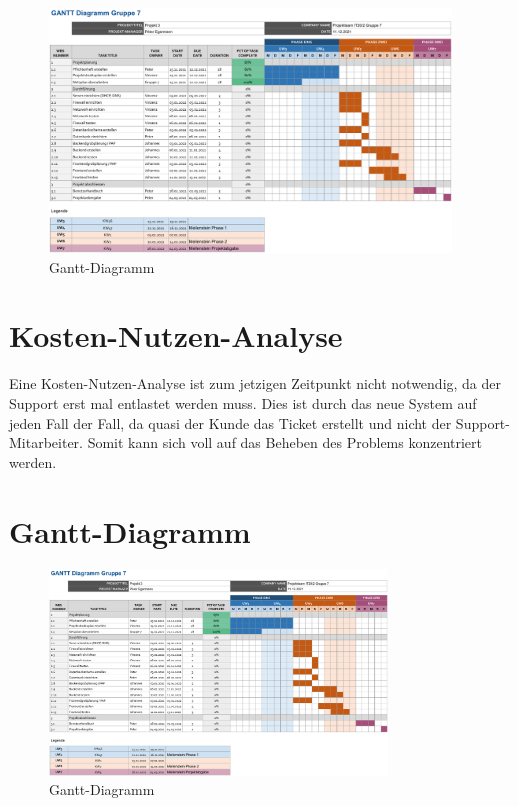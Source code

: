 \documentclass[a4paper,12pt,headings=small,ngerman,bibliography=totoc]{scrartcl}
\begin{document}
\begin{figure}[htbp]
  \centering
  \includegraphics[width=0.95\textwidth]{data/Gantt.png}
  \caption{Gantt-Diagramm}
  \label{fig:Gantt}
\end{figure}


\section{Kosten-Nutzen-Analyse}

Eine Kosten-Nutzen-Analyse ist zum jetzigen Zeitpunkt nicht notwendig, da der Support erst mal entlastet werden muss. Dies ist durch das neue System auf jeden Fall der Fall, da quasi der Kunde das Ticket erstellt und nicht der Support-Mitarbeiter. Somit kann sich voll auf das Beheben des Problems konzentriert werden.


\newpage
\appendix
{}

\section{Gantt-Diagramm}

\begin{figure}[h!]
  \centering
  \includegraphics[angle=90,origin=c,width=0.8\textwidth]{data/Gantt.png}
  \caption{Gantt-Diagramm}
  \label{app:Gantt}
\end{figure}
\end{document}
